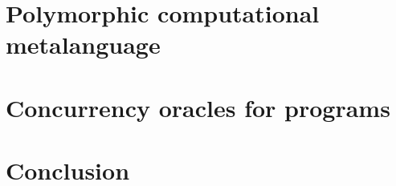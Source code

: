 \documentclass[runningheads]{llncs}
\begin{document}
\section{Polymorphic computational metalanguage\label{sec:metalanguage}}


\section{Concurrency oracles for programs\label{sec:oracles}}


\section{Conclusion}
%
%
%

\end{document}
